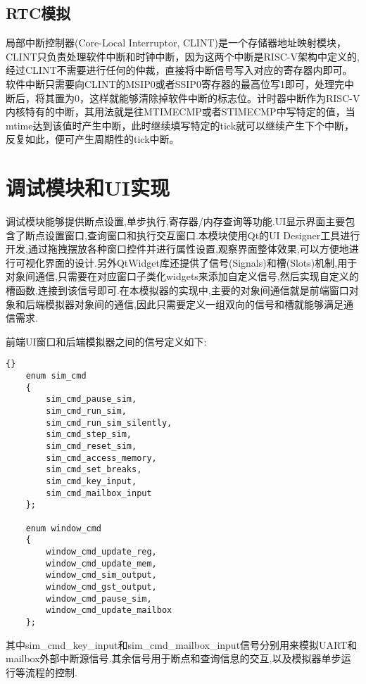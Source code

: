 \subsection{RTC模拟}

局部中断控制器(Core-Local Interruptor, CLINT)是一个存储器地址映射模块，CLINT只负责处理软件中断和时钟中断，因为这两个中断是RISC-V架构中定义的,经过CLINT不需要进行任何的仲裁，直接将中断信号写入对应的寄存器内即可。软件中断只需要向CLINT的MSIP0或者SSIP0寄存器的最高位写1即可，处理完中断后，将其置为0，这样就能够清除掉软件中断的标志位。计时器中断作为RISC-V内核特有的中断，其用法就是往MTIMECMP或者STIMECMP中写特定的值，当mtime达到该值时产生中断，此时继续填写特定的tick就可以继续产生下个中断，反复如此，便可产生周期性的tick中断。



\section{调试模块和UI实现}
调试模块能够提供断点设置,单步执行,寄存器/内存查询等功能.UI显示界面主要包含了断点设置窗口,查询窗口和执行交互窗口.本模块使用Qt的UI Designer工具进行开发,通过拖拽摆放各种窗口控件并进行属性设置,观察界面整体效果,可以方便地进行可视化界面的设计.另外QtWidget库还提供了信号(Signals)和槽(Slots)机制,用于对象间通信,只需要在对应窗口子类化widgets来添加自定义信号,然后实现自定义的槽函数,连接到该信号即可.在本模拟器的实现中,主要的对象间通信就是前端窗口对象和后端模拟器对象间的通信,因此只需要定义一组双向的信号和槽就能够满足通信需求.


前端UI窗口和后端模拟器之间的信号定义如下:
\begin{lstlisting}{}
    enum sim_cmd
    {
        sim_cmd_pause_sim,
        sim_cmd_run_sim,
        sim_cmd_run_sim_silently,
        sim_cmd_step_sim,
        sim_cmd_reset_sim,
        sim_cmd_access_memory,
        sim_cmd_set_breaks,
        sim_cmd_key_input,
        sim_cmd_mailbox_input
    };
        
    enum window_cmd
    {
        window_cmd_update_reg,
        window_cmd_update_mem,
        window_cmd_sim_output,
        window_cmd_gst_output,
        window_cmd_pause_sim,
        window_cmd_update_mailbox
    };          
\end{lstlisting}
其中sim\_cmd\_key\_input和sim\_cmd\_mailbox\_input信号分别用来模拟UART和mailbox外部中断源信号.其余信号用于断点和查询信息的交互,以及模拟器单步运行等流程的控制.
        
